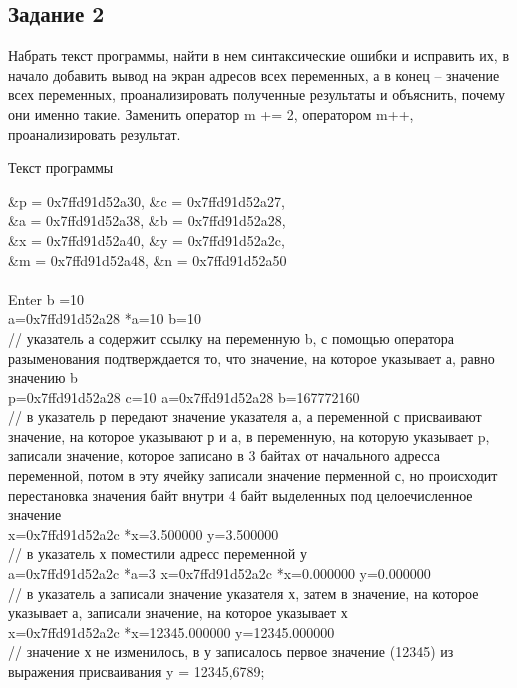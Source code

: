\documentclass[a4paper,14pt]{extarticle}
\begin{document}
\subsection{Задание 2}
Набрать текст программы, найти в нем синтаксические ошибки и исправить их, в начало добавить вывод на экран адресов всех переменных, а в конец -- значение всех переменных, проанализировать полученные результаты и объяснить, почему они именно такие. Заменить оператор m += 2, оператором m++, проанализировать результат.

\begin{center}
{\small Текст программы}
\end{center}
\begin{footnotesize}
\&p = 0x7ffd91d52a30, \&c = 0x7ffd91d52a27,\\ \&a = 0x7ffd91d52a38, \&b = 0x7ffd91d52a28,\\
\&x = 0x7ffd91d52a40, \&y = 0x7ffd91d52a2c,\\ \&m = 0x7ffd91d52a48, \&n = 0x7ffd91d52a50\\\\
Enter b =10\\
a=0x7ffd91d52a28	*a=10	b=10\\
// указатель а содержит ссылку на переменную b, с помощью оператора разыменования подтверждается то, что значение, на которое указывает а, равно значению b\\ 
p=0x7ffd91d52a28	c=10	a=0x7ffd91d52a28	b=167772160\\
// в указатель р передают значение указателя а, а переменной с присваивают значение, на которое указывают р и а, в переменную, на которую указывает p, записали значение, которое записано в 3 байтах от начального адресса переменной, потом в эту ячейку записали значение перменной с, но происходит перестановка значения байт внутри 4 байт выделенных под целоечисленное значение\\
x=0x7ffd91d52a2c	*x=3.500000	y=3.500000\\
// в указатель х поместили адресс переменной у\\
a=0x7ffd91d52a2c	*a=3	x=0x7ffd91d52a2c	*x=0.000000	y=0.000000\\
// в указатель а записали значение указателя х, затем в значение, на которое указывает а, записали значение, на которое указывает х\\
x=0x7ffd91d52a2c	*x=12345.000000	y=12345.000000\\
// значение х не изменилось, в у записалось первое значение (12345) из выражения присваивания y = 12345,6789;\\

\end{footnotesize}
\end{document}
